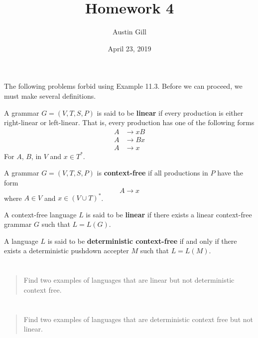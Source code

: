 \documentclass{article}
\title{Homework 4}
\author{Austin Gill}
\date{April 23, 2019}
\begin{document}
\maketitle

The following problems forbid using Example 11.3. Before we can proceed, we must make several definitions.

\begin{defn}
    A grammar $G = (V, T, S, P)$ is said to be \textbf{linear} if every production is either right-linear or left-linear. That is, every production has one of the following forms
    \begin{align*}
        A & \to xB \\
        A & \to Bx \\
        A & \to x
    \end{align*}
    For $A$, $B$, in $V$ and $x \in T^*$.
\end{defn}

\begin{defn}
    A grammar $G = (V, T, S, P)$ is \textbf{context-free} if all productions in $P$ have the form \[A \to x\] where $A \in V$ and $x \in {(V \cup T)}^*$.
\end{defn}

\begin{defn}
    A context-free language $L$ is said to be \textbf{linear} if there exists a linear context-free grammar $G$ such that $L = L(G)$.
\end{defn}

\begin{defn}
    A language $L$ is said to be \textbf{deterministic context-free} if and only if there exists a deterministic pushdown accepter $M$ such that $L = L(M)$.
\end{defn}

\section{}
\begin{quote}
    Find two examples of languages that are linear but not deterministic context free.
\end{quote}

\section{}
\begin{quote}
    Find two examples of languages that are deterministic context free but not linear.
\end{quote}
\end{document}
